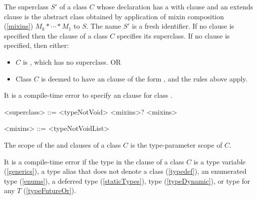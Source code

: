 \documentclass[makeidx]{article}
\begin{document}
\LMHash{}%
The superclass $S'$ of a class $C$ whose declaration has a with clause
and an extends clause
is the abstract class obtained by application of
mixin composition (\ref{mixins}) $M_k* \cdots * M_1$ to $S$.
The name $S'$ is a fresh identifier.
If no \WITH{} clause is specified then the \EXTENDS{} clause of
a class $C$ specifies its superclass.
If no \EXTENDS{} clause is specified, then either:
\begin{itemize}
\item $C$ is , which has no superclass. OR
\item Class $C$ is deemed to have an \EXTENDS{} clause of the form
, and the rules above apply.
\end{itemize}

\LMHash{}%
It is a compile-time error to specify an \EXTENDS{} clause
for class .

\begin{grammar}
<superclass> ::= \EXTENDS{} <typeNotVoid> <mixins>?
    \alt <mixins>

<mixins> ::= \WITH{} <typeNotVoidList>
\end{grammar}


\LMHash{}%
The scope of the \EXTENDS{} and \WITH{} clauses of a class $C$ is the type-parameter scope of $C$.

\LMHash{}%
It is a compile-time error if the type in the \EXTENDS{} clause of a class $C$ is
a type variable (\ref{generics}), a type alias that does not denote a class (\ref{typedef}),
an enumerated type (\ref{enums}),
a deferred type (\ref{staticTypes}), type \DYNAMIC{} (\ref{typeDynamic}),
or type  for any $T$ (\ref{typeFutureOr}).


\end{document}
